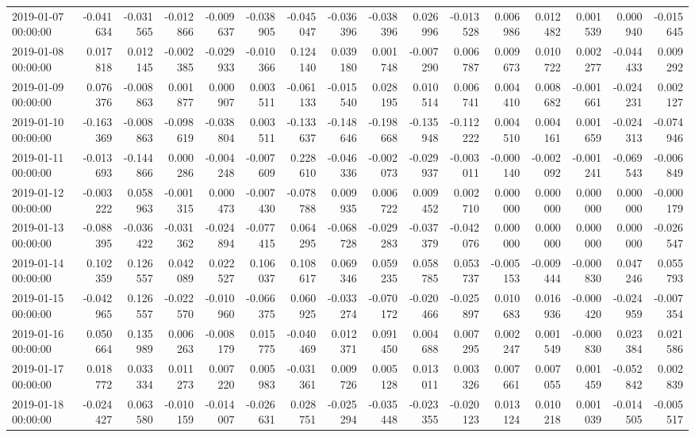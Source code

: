 \begin{tabular}{lrrrrrrrrrrrrrrr}
2019-01-07 00:00:00 & -0.041634 & -0.031565 & -0.012866 & -0.009637 & -0.038905 & -0.045047 & -0.036396 & -0.038396 & 0.026996 & -0.013528 & 0.006986 & 0.012482 & 0.001539 & 0.000940 & -0.015645 \\
2019-01-08 00:00:00 & 0.017818 & 0.012145 & -0.002385 & -0.029933 & -0.010366 & 0.124140 & 0.039180 & 0.001748 & -0.007290 & 0.006787 & 0.009673 & 0.010722 & 0.002277 & -0.044433 & 0.009292 \\
2019-01-09 00:00:00 & 0.076376 & -0.008863 & 0.001877 & 0.000907 & 0.003511 & -0.061133 & -0.015540 & 0.028195 & 0.010514 & 0.006741 & 0.004410 & 0.008682 & -0.001661 & -0.024231 & 0.002127 \\
2019-01-10 00:00:00 & -0.163369 & -0.008863 & -0.098619 & -0.038804 & 0.003511 & -0.133637 & -0.148646 & -0.198668 & -0.135948 & -0.112222 & 0.004510 & 0.004161 & 0.001659 & -0.024313 & -0.074946 \\
2019-01-11 00:00:00 & -0.013693 & -0.144866 & 0.000286 & -0.004248 & -0.007609 & 0.228610 & -0.046336 & -0.002073 & -0.029937 & -0.003011 & -0.000140 & -0.002092 & -0.001241 & -0.069543 & -0.006849 \\
2019-01-12 00:00:00 & -0.003222 & 0.058963 & -0.001315 & 0.000473 & -0.007430 & -0.078788 & 0.009935 & 0.006722 & 0.009452 & 0.002710 & 0.000000 & 0.000000 & 0.000000 & 0.000000 & -0.000179 \\
2019-01-13 00:00:00 & -0.088395 & -0.036422 & -0.031362 & -0.024894 & -0.077415 & 0.064295 & -0.068728 & -0.029283 & -0.037379 & -0.042076 & 0.000000 & 0.000000 & 0.000000 & 0.000000 & -0.026547 \\
2019-01-14 00:00:00 & 0.102359 & 0.126557 & 0.042089 & 0.022527 & 0.106037 & 0.108617 & 0.069346 & 0.059235 & 0.058785 & 0.053737 & -0.005153 & -0.009444 & -0.000830 & 0.047246 & 0.055793 \\
2019-01-15 00:00:00 & -0.042965 & 0.126557 & -0.022570 & -0.010960 & -0.066375 & 0.060925 & -0.033274 & -0.070172 & -0.020466 & -0.025897 & 0.010683 & 0.016936 & -0.000420 & -0.024959 & -0.007354 \\
2019-01-16 00:00:00 & 0.050664 & 0.135989 & 0.006263 & -0.008179 & 0.015775 & -0.040469 & 0.012371 & 0.091450 & 0.004688 & 0.007295 & 0.002247 & 0.001549 & -0.000830 & 0.023384 & 0.021586 \\
2019-01-17 00:00:00 & 0.018772 & 0.033334 & 0.011273 & 0.007220 & 0.005983 & -0.031361 & 0.009726 & 0.005128 & 0.013011 & 0.003326 & 0.007661 & 0.007055 & 0.001459 & -0.052842 & 0.002839 \\
2019-01-18 00:00:00 & -0.024427 & 0.063580 & -0.010159 & -0.014007 & -0.026631 & 0.028751 & -0.025294 & -0.035448 & -0.023355 & -0.020123 & 0.013124 & 0.010218 & 0.001039 & -0.014505 & -0.005517 \\

\end{tabular}
